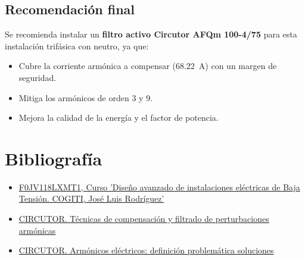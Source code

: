 \documentclass[a4paper,10pt]{article}
\begin{document}
\begin{Form}
\subsection{Recomendación final}
Se recomienda instalar un \textbf{filtro activo Circutor AFQm 100-4/75} para esta instalación trifásica con neutro, ya que:
\begin{itemize}
    \item Cubre la corriente armónica a compensar (\SI{68.22}{A}) con un margen de seguridad.
    \item Mitiga los armónicos de orden 3 y 9.
    \item Mejora la calidad de la energía y el factor de potencia.
\end{itemize}



















































\section{Bibliografía}
\begin{itemize}
    \item \href{https://www.ingenierosformacion.com/}{F0JV118LXMT1, Curso 'Diseño avanzado de instalaciones eléctricas de Baja Tensión. COGITI, José Luis Rodríguez' }
    \item \href{https://circutor.com/soporte/formacion/notebooks/armonicos-electricos/}{CIRCUTOR. Técnicas de compensación y filtrado de perturbaciones armónicas }
    \item \href{https://circutor.com/articulos/armonicos-electricos-definicion-problematica-soluciones/}{CIRCUTOR. Armónicos eléctricos: definición  problemática  soluciones }
\end{itemize}









\end{Form}
\end{document}
